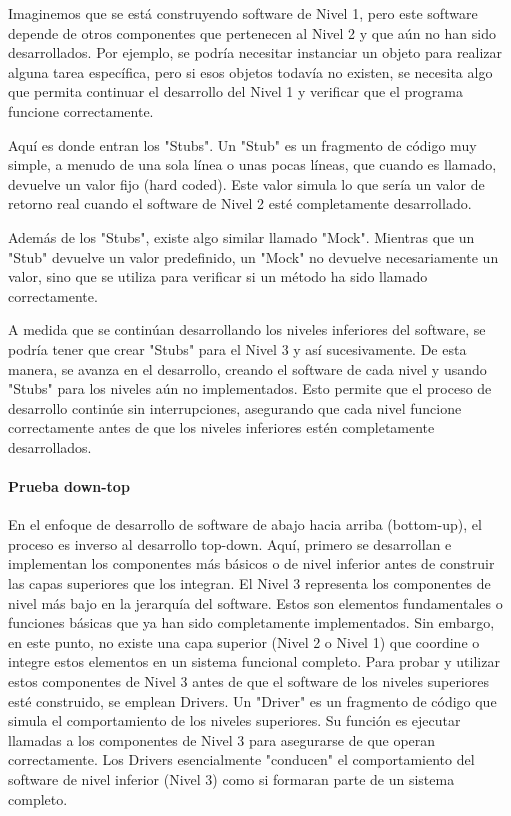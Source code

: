 Imaginemos que se está construyendo software de Nivel 1, pero este software depende de otros componentes que pertenecen al Nivel 2 y que aún no han sido desarrollados. Por ejemplo, se podría necesitar instanciar un objeto para realizar alguna tarea específica, pero si esos objetos todavía no existen, se necesita algo que permita continuar el desarrollo del Nivel 1 y verificar que el programa funcione correctamente.

Aquí es donde entran los "Stubs". Un "Stub" es un fragmento de código muy simple, a menudo de una sola línea o unas pocas líneas, que cuando es llamado, devuelve un valor fijo (hard coded). Este valor simula lo que sería un valor de retorno real cuando el software de Nivel 2 esté completamente desarrollado.

Además de los "Stubs", existe algo similar llamado "Mock". Mientras que un "Stub" devuelve un valor predefinido, un "Mock" no devuelve necesariamente un valor, sino que se utiliza para verificar si un método ha sido llamado correctamente.

A medida que se continúan desarrollando los niveles inferiores del software, se podría tener que crear "Stubs" para el Nivel 3 y así sucesivamente. De esta manera, se avanza en el desarrollo, creando el software de cada nivel y usando "Stubs" para los niveles aún no implementados. Esto permite que el proceso de desarrollo continúe sin interrupciones, asegurando que cada nivel funcione correctamente antes de que los niveles inferiores estén completamente desarrollados.

\paragraph{Prueba down-top} En el enfoque de desarrollo de software de abajo hacia arriba (bottom-up), el proceso es inverso al desarrollo top-down. Aquí, primero se desarrollan e implementan los componentes más básicos o de nivel inferior antes de construir las capas superiores que los integran. El Nivel 3 representa los componentes de nivel más bajo en la jerarquía del software. Estos son elementos fundamentales o funciones básicas que ya han sido completamente implementados. Sin embargo, en este punto, no existe una capa superior (Nivel 2 o Nivel 1) que coordine o integre estos elementos en un sistema funcional completo. Para probar y utilizar estos componentes de Nivel 3 antes de que el software de los niveles superiores esté construido, se emplean Drivers. Un "Driver" es un fragmento de código que simula el comportamiento de los niveles superiores. Su función es ejecutar llamadas a los componentes de Nivel 3 para asegurarse de que operan correctamente. Los Drivers esencialmente "conducen" el comportamiento del software de nivel inferior (Nivel 3) como si formaran parte de un sistema completo.

